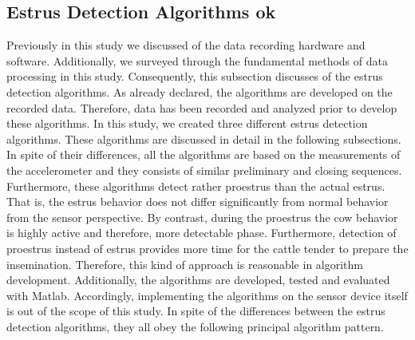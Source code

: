 \documentclass[english,12pt,a4paper,pdftex,elec,utf8]{aaltothesis}
\begin{document}
\subsection{Estrus Detection Algorithms ok} \label{estrusdetectionalgorithmssection}

Previously in this study we discussed of the data recording hardware and software. Additionally, we surveyed through the fundamental methods of data processing in this study. Consequently, this subsection discusses of the estrus detection algorithms. As already declared, the algorithms are developed on the recorded data. Therefore, data has been recorded and analyzed prior to develop these algorithms. In this study, we created three different estrus detection algorithms. These algorithms are discussed in detail in the following subsections. In spite of their differences, all the algorithms are based on the measurements of the accelerometer and they consists of similar preliminary and closing sequences. Furthermore, these algorithms detect rather proestrus than the actual estrus. That is, the estrus behavior does not differ significantly from normal behavior from the sensor perspective. By contrast, during the proestrus the cow behavior is highly active and therefore, more detectable phase. Furthermore, detection of proestrus instead of estrus provides more time for the cattle tender to prepare the insemination. Therefore, this kind of approach is reasonable in algorithm development. Additionally, the algorithms are developed, tested and evaluated with Matlab. Accordingly, implementing the algorithms on the sensor device itself is out of the scope of this study. In spite of the differences between the estrus detection algorithms, they all obey the following principal algorithm pattern.
  
\end{document}
